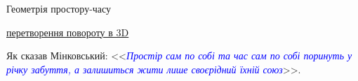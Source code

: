 \documentclass[]{beamer}
\begin{document}
\begin{frame}{Геометрія простору-часу}{}
\begin{overprint}
		\vfill

		{\tiny \href{https://uk.wikipedia.org/wiki/\%D0\%9C\%D0\%B0\%D1\%82\%D1\%80\%D0\%B8\%D1\%86\%D1\%8F_\%D0\%BF\%D0\%BE\%D0\%B2\%D0\%BE\%D1\%80\%D0\%BE\%D1\%82\%D1\%83}{перетворення повороту в 3D} }
		\onslide<3>
		\begin{block}{}\centering
			Як сказав Мінковський: <<\textcolor{blue}{\itshape Простір сам по собі та час сам по собі поринуть у річку забуття, а залишиться жити лише
			своєрідний їхній
				союз}>>.
		\end{block}
	\end{overprint}
\end{frame}




\end{document}

